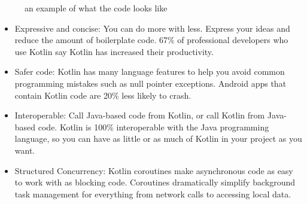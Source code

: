 \documentclass[12pt,oneside]{book}
\begin{document}
\begin{figure}
  \centering
  \caption{an example of what the code looks like}
\end{figure}

\begin{itemize}
  \item Expressive and concise: You can do more with less. Express your ideas and reduce the amount of boilerplate code. 67\% of professional developers who use Kotlin say Kotlin has increased their productivity.
  \item Safer code: Kotlin has many language features to help you avoid common programming mistakes such as null pointer exceptions. Android apps that contain Kotlin code are 20\% less likely to crash.
    \newpage
  \item Interoperable: Call Java-based code from Kotlin, or call Kotlin from Java-based code. Kotlin is 100\% interoperable with the Java programming language, so you can have as little or as much of Kotlin in your project as you want.
  \item Structured Concurrency: Kotlin coroutines make asynchronous code as easy to work with as blocking code. Coroutines dramatically simplify background task management for everything from network calls to accessing local data.


\end{itemize}
\end{document}
